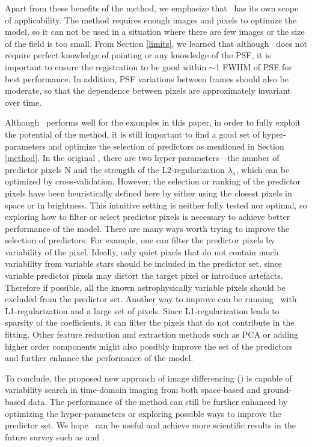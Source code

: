 Apart from these benefits of the method, we emphasize that \cpmdiff\ has its own scope of applicability.
The method requires enough images and pixels to optimize the model, so it can not be used in a situation where there are few images or the size of the field is too small. 
From Section \ref{limits}, we learned that although \cpmdiff\ does not require perfect knowledge of pointing or any knowledge of the PSF, it is important to ensure the registration to be good within $\sim$1 FWHM of PSF for best performance.
In addition, PSF variations between frames should also be moderate, so that the dependence between pixels are approximately invariant over time.

Although \cpmdiff\ performs well for the examples in this paper,  in order to fully exploit the potential of the method, it is still important to find a good set of hyper-parameters and optimize the selection of predictors as mentioned in Section \ref{method}. 
In the original \cpm, there are two hyper-parameters---the number of predictor pixels N and the strength of the L2-regularization $\lambda_a$, which can be optimized by cross-validation. 
However, the selection or ranking of the predictor pixels have been heuristically defined here by either using the closest pixels in space or in brightness.
This intuitive setting is neither fully tested nor optimal, so exploring how to filter or select predictor pixels is necessary to achieve better performance of the model.
There are many ways worth trying to improve the selection of predictors.
For example, one can filter the predictor pixels by variability of the pixel.
Ideally, only quiet pixels that do not contain much variability from variable stars should be included in the predictor set, since variable predictor pixels may distort the target pixel or introduce artefacts.
Therefore if possible, all the known astrophysically variable pixels should be excluded from the predictor set. 
Another way to improve can be running \cpm\ with L1-regularization and a large set of pixels. 
Since L1-regularization leads to sparsity of the coefficients, it can filter the pixels that do not contribute in the fitting. 
Other feature reduction and extraction methods such as PCA or adding higher order components might also possibly improve the set of the predictors and further enhance the performance of the model. 

To conclude, the proposed new approach of image differencing (\cpmdiff) is capable of variability search in time-domain imaging from both space-based and ground-based data.
The performance of the method can still be further enhanced by optimizing the hyper-parameters or exploring possible ways to improve the predictor set.
We hope \cpmdiff\ can be useful and achieve more scientific results in the future survey such as  and .

